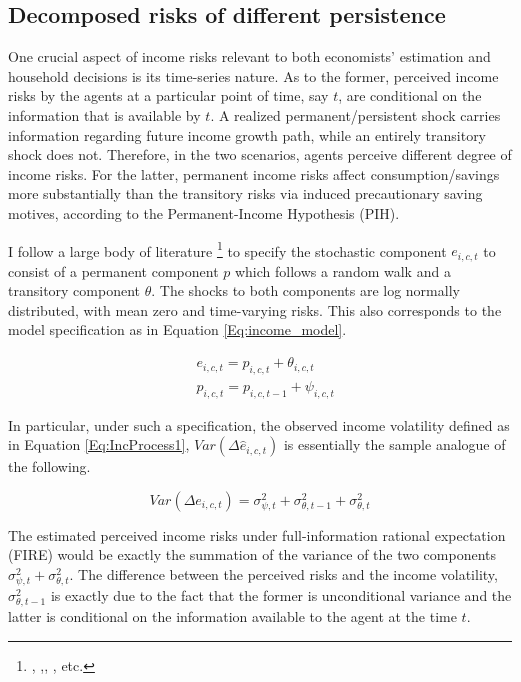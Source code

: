 \hypertarget{decomposed-risks-of-different-nature}{%
\subsection{Decomposed risks of different persistence}\label{dcomposed-risks-of-different-nature}}

One crucial aspect of income risks relevant to both economists' estimation and household decisions is its time-series nature. As to the former, perceived income risks by the agents at a particular point of time, say $t$, are conditional on the information that is available by $t$. A realized permanent/persistent shock carries information regarding future income growth path, while an entirely transitory shock does not. Therefore, in the two scenarios, agents perceive different degree of income risks. For the latter, permanent income risks affect consumption/savings more substantially than the transitory risks via induced precautionary saving motives, according to the Permanent-Income Hypothesis (PIH). 

I follow a large body of literature \footnote{\cite{abowd1989covariance}, \cite{gottschalk1994growth},\cite{carroll1997nature}, \cite{blundell_consumption_2008}, etc.} to specify the stochastic component $e_{i,c,t}$ to consist of a permanent component $p$ which follows a random walk and a transitory component $\theta$. The shocks to both components are log normally distributed, with mean zero and time-varying risks. This also corresponds to the model specification as in Equation \ref{Eq:income_model}.

\begin{equation}
\begin{split}
\label{Eq:IncProcess}
& e_{i,c,t} = p_{i,c,t} + \theta_{i,c,t} \\
& p_{i,c,t} = p_{i,c,t-1}+\psi_{i,c,t} 
\end{split}
\end{equation}

In particular, under such a specification, the observed income volatility defined as in Equation \ref{Eq:IncProcess1}, $Var(\Delta \hat e_{i,c,t})$ is essentially the sample analogue of the following.

\begin{equation}
\label{Eq:income_volatility}
    Var(\Delta e_{i,c,t}) = \sigma^2_{\psi,t} + \sigma^2_{\theta,t-1} +\sigma^2_{\theta,t}
\end{equation}


The estimated perceived income risks under full-information rational expectation (FIRE) would be exactly the summation of the variance of the two components $\sigma^2_{\psi,t}+\sigma^2_{\theta,t}$. The difference between the perceived risks and the income volatility, $\sigma^2_{\theta,t-1}$ is exactly due to the fact that the former is unconditional variance and the latter is conditional on the information available to the agent at the time $t$. 

